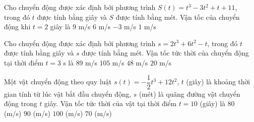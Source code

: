 \begin{ex}%
	Cho chuyển động được xác định bởi phương trình $S(t)=t^{3}-3t^{2}+t+11$, trong đó $t$ được tính bằng giây và $S$ được tính bằng mét. Vận tốc của chuyển động khi $t=2$  giây là
	\choice 
		{$9$ m/s} 
		 {$6$ m/s}
		 {$-3$ m/s}
		{\True $1$  m/s}
\end{ex}

\begin{ex}%
	Cho chuyển động được xác định bởi phương trình $s=2t^3+6t^2-t$, trong đó $t$ được tính bằng giây và $s$ được tính bằng mét. Vận tốc tức thời của chuyển động tại thời điểm $t=3$  s là
	 \choice
		{\True $89$ m/s} 
		{$105$  m/s}
		{$48$  m/s}
		{$20$ m/s} 
\end{ex}

\begin{ex}%
	Một vật  chuyển động theo quy luật $s(t)=-\dfrac{1}{2}t^3+12t^2$, $t$ (giây) là khoảng thời gian tính từ lúc vật bắt đầu chuyển động, $s$ (mét) là quãng đường vật chuyển động trong $t$ giây. Vận tốc tức thời của vật tại thời điểm $t=10$ (giây) là
	\choice 
		 {$80$ (m/s)}
		{\True  $90$ (m/s)}
		{$100$ (m/s)} 
		{$70$  (m/s)}
\end{ex}


